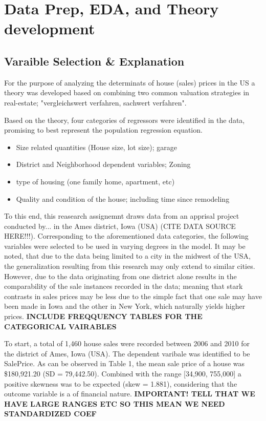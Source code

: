 \documentclass{article}
\begin{document}
\section{Data Prep, EDA, and Theory development}
\subsection{Varaible Selection \& Explanation}
\indent For the purpose of analyzing the determinats of house (sales) prices in the US a theory was developed based on combining two common valuation strategies in real-estate; "vergleichswert verfahren, sachwert verfahren".

\indent Based on the theory, four categories of regressors were identified in the data, promising to best represent the population regression equation. 
\begin{itemize}
  \item Size related quantities (House size, lot size); garage
  \item District and Neighborhood dependent variables; Zoning
  \item type of housing (one family home, apartment, etc)
  \item Quality and condition of the house; including time since remodeling
\end{itemize}

To this end, this reasearch assignemnt draws data from an apprisal project conducted by... in the Ames district, Iowa (USA) (CITE DATA SOURCE HERE!!!). Corresponding to the aforementioned data categories, the following variables were selected to be used in varying degrees in the model. It may be noted, that due to the data being limited to a city in the midwest of the USA, the generalization resulting from this research may only extend to similar cities. However, due to the data originating from one district alone results in the comparability of the sale instances recorded in the data; meaning that stark contrasts in sales prices may be less due to the simple fact that one sale may have been made in Iowa and the other in New York, which naturally yields higher prices.
\textbf{INCLUDE FREQQUENCY TABLES FOR THE CATEGORICAL VAIRABLES}


To start, a total of 1,460 house sales were recorded between 2006 and 2010 for the district of Ames, Iowa (USA). The dependent varibale was identified to be SalePrice. As can be observed in Table 1, the mean sale price of a house was \$180,921.20 (SD = 79,442.50). Combined with the range [34,900, 755,000] a positive skewness was to be expected (skew = 1.881), considering that the outcome variable is a of financial nature.
\textbf{IMPORTANT! TELL THAT WE HAVE LARGE RANGES ETC SO THIS MEAN WE NEED STANDARDIZED COEF}
\end{document}
